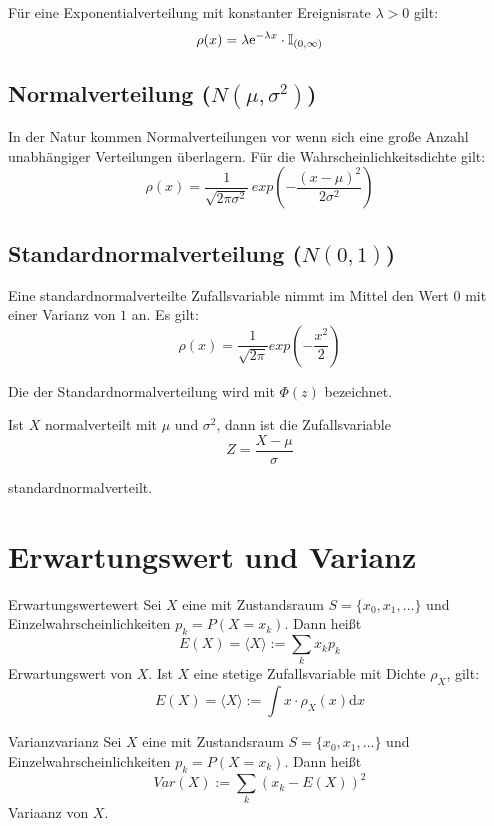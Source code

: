 Für eine Exponentialverteilung mit konstanter Ereignisrate $\lambda>0$ gilt:
\[\rho(x) = \lambda \mathrm{e}^{-\lambda x}\cdot\mathbb{I}_{(0, \infty)}\]

\subsection{Normalverteilung ($N(\mu, \sigma^2)$)}

In der Natur kommen Normalverteilungen vor wenn sich eine große Anzahl
unabhängiger Verteilungen überlagern. Für die Wahrscheinlichkeitsdichte gilt:
\[\rho(x) = \frac{1}{\sqrt{2\pi\sigma^2}}\,exp(-\frac{(x-\mu)^2}{2\sigma^2})\]


\subsection{Standardnormalverteilung ($N(0,1)$)}

Eine standardnormalverteilte Zufallsvariable nimmt im Mittel den Wert $0$ mit
einer Varianz von $1$ an. Es gilt:
\[\rho(x) = \frac{1}{\sqrt{2\pi}}exp(-\frac{x^2}{2})\]

Die  der Standardnormalverteilung wird mit $\Phi(z)$ bezeichnet.

Ist $X$ normalverteilt mit $\mu$ und $\sigma^2$, dann ist die Zufallsvariable
\[Z=\frac{X-\mu}{\sigma}\]

standardnormalverteilt.

\section{Erwartungswert und Varianz}

\begin{definition}{Erwartungswert}{ewert}
Sei $X$ eine  mit Zustandsraum $S=\{x_0, x_1,
...\}$ und Einzelwahrscheinlichkeiten $p_k=P(X=x_k)$. Dann heißt
\[E(X) =\langle X\rangle := \sum_k x_kp_k\]
Erwartungswert von $X$. Ist $X$ eine stetige Zufallsvariable mit Dichte
$\rho_X$, gilt:
\[E(X) =\langle X\rangle := \int x\cdot\rho_X(x)\mathrm{d}x\]
\end{definition}

\begin{definition}{Varianz}{varianz}
Sei $X$ eine  mit Zustandsraum $S=\{x_0, x_1,
...\}$ und Einzelwahrscheinlichkeiten $p_k=P(X=x_k)$. Dann heißt
\[Var(X) := \sum_k (x_k - E(X))^2\]
Variaanz von $X$.
\end{definition}

